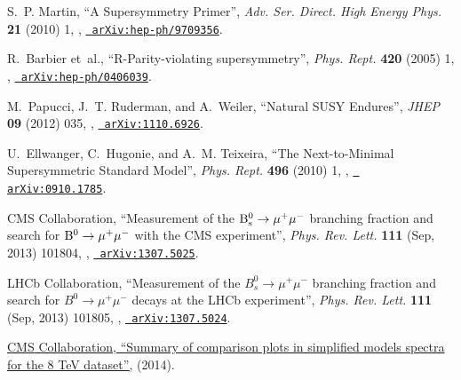 \documentclass[12pt]{thesis}  %
\begin{document}
\begin{thebibliography}{100}
\hrefCMSnoop {} {S.~P. Martin, ``{A Supersymmetry Primer}'',} \textit{ Adv.
  Ser. Direct. High Energy Phys.} \textbf{ 21} (2010) 1,
  \href{http://dx.doi.org/10.1142/9789814307505_0001}{},
\href{http://www.arXiv.org/abs/hep-ph/9709356}{\texttt{ arXiv:hep-ph/9709356}}.

R.~Barbier\hrefCMSnoop {} { {et~al.}, ``R-Parity-violating supersymmetry'',}
  \textit{ Phys. Rept.} \textbf{ 420} (2005) 1,
  \href{http://dx.doi.org/10.1016/j.physrep.2005.08.006}{},
  \href{http://www.arXiv.org/abs/hep-ph/0406039}{\texttt{
  arXiv:hep-ph/0406039}}.

\hrefCMSnoop {} {M.~Papucci, J.~T. Ruderman, and A.~Weiler, ``{Natural SUSY
  Endures}'',} \textit{ JHEP} \textbf{ 09} (2012) 035,
  \href{http://dx.doi.org/10.1007/JHEP09(2012)035}{},
\href{http://www.arXiv.org/abs/1110.6926}{\texttt{ arXiv:1110.6926}}.

\hrefCMSnoop {} {U.~Ellwanger, C.~Hugonie, and A.~M. Teixeira, ``The
  Next-to-Minimal Supersymmetric Standard Model'',} \textit{ Phys. Rept.}
  \textbf{ 496} (2010) 1,
  \href{http://dx.doi.org/10.1016/j.physrep.2010.07.001}{},
  \href{http://www.arXiv.org/abs/0910.1785}{\texttt{ arXiv:0910.1785}}.

\hrefCMSnoop {} {{ CMS} Collaboration, ``Measurement of the $\mathrm{B}^{0}_{\mathrm{s}}
  \rightarrow \mu^{+} \mu^{-}$ branching fraction and search for $\mathrm{B}^{0}
  \rightarrow \mu^{+} \mu^{-}$ with the CMS experiment'',} \textit{ Phys. Rev.
  Lett.} \textbf{ 111} (Sep, 2013) 101804,
  \href{http://dx.doi.org/10.1103/PhysRevLett.111.101804}{},
  \href{http://www.arXiv.org/abs/1307.5025}{\texttt{ arXiv:1307.5025}}.

\hrefCMSnoop {} {{ LHCb} Collaboration, ``Measurement of the $B^{0}_{s}
  \rightarrow \mu^{+} \mu^{-}$ branching fraction and search for $B^{0}
  \rightarrow \mu^{+} \mu^{-}$ decays at the LHCb experiment'',} \textit{ Phys.
  Rev. Lett.} \textbf{ 111} (Sep, 2013) 101805,
  \href{http://dx.doi.org/10.1103/PhysRevLett.111.101805}{},
  \href{http://www.arXiv.org/abs/1307.5024}{\texttt{ arXiv:1307.5024}}.

\href {https://twiki.cern.ch/twiki/bin/view/CMSPublic/SUSYSMSSummaryPlots8TeV}
  {{ CMS} Collaboration, ``Summary of comparison plots in simplified models
  spectra for the 8 TeV dataset'',} (2014).


\end{thebibliography}
\end{document}

